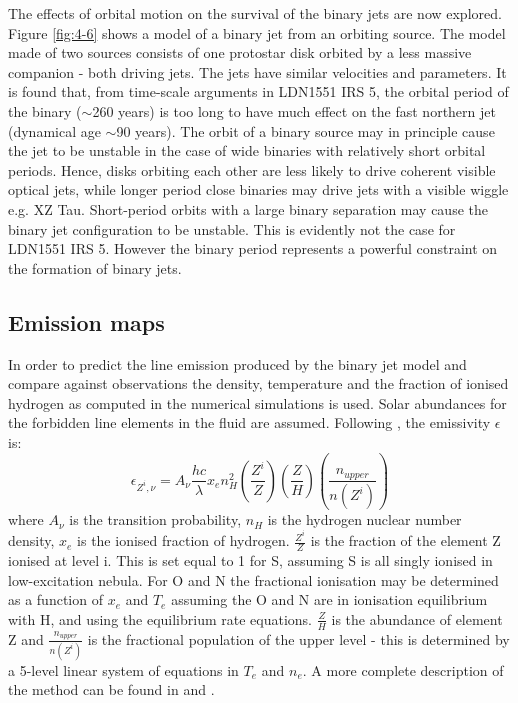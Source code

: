 The effects of orbital motion on the survival of the binary jets are now explored.
Figure \ref{fig:4-6} shows a model of a binary jet from an orbiting  source. The
model made of two sources consists of one protostar disk orbited by a less massive
companion - both driving jets. The jets have similar velocities and parameters.
It is found that, from time-scale arguments in LDN1551 IRS 5, the orbital period 
of the binary ($\sim$260 years) is too long to have much effect on the fast 
northern jet (dynamical age $\sim$90 years).
The orbit of a binary source may in principle cause the jet to be unstable in
the case of wide binaries with relatively short orbital periods.
Hence, disks orbiting each other are less likely to drive 
coherent visible optical jets, while longer period close binaries 
may drive jets with a visible wiggle e.g. XZ Tau.
Short-period orbits with a large binary separation may cause the binary jet
configuration to be unstable. This is evidently not the case for LDN1551 IRS 5. 
However the binary period represents a powerful constraint on the formation of binary
jets.

\subsection{Emission maps}
In order to predict the line emission produced by the binary jet model and compare
against observations the density, temperature and the fraction
of ionised hydrogen as computed in the numerical simulations is used. 
Solar abundances for the forbidden line elements in the fluid are assumed.
Following \citet{2002RMxAC..13....8B}, the emissivity $\epsilon$ is:
\begin{equation}
\epsilon_{Z^i, \nu} = A_{\nu} \frac{hc}{\lambda} x_e n_H^2 
\left( \frac{Z^i}{Z}\right) 
\left( \frac{Z}{H}\right) 
\left( \frac{n_{upper}}{n(Z^i)} \right)
\end{equation}
where
$A_{\nu}$ is the transition probability,
$n_H$ is the hydrogen nuclear number density,
$x_e$ is the ionised fraction of hydrogen.
$ \frac{Z^i}{Z} $ is the fraction of the element Z ionised at level i.
This is set equal to 1 for S, assuming S is all singly ionised in
low-excitation nebula.
For O and N the fractional ionisation may be determined as a function of $x_e$
and $T_e$ assuming the O and N are in ionisation equilibrium with H, and using the
equilibrium rate equations.
$\frac{Z}{H}$ is the abundance of element Z and
$ \frac{n_{upper}}{n(Z^i)}$ is the fractional population of the upper level
- this is determined by a 5-level linear system of equations in $T_e$ and $n_e$.
A more complete description of the method can be found in
\citet{1995A&A...296..185B, 1999A&A...342..717B} and \citet{2002RMxAC..13....8B}.



